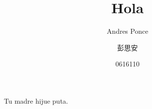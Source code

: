 \documentclass{article}
\author{Andres Ponce \\
	\and
	彭思安\\
	\and
	0616110
}
\title{Hola}
\begin{document}
\maketitle
Tu madre hijue puta.
\end{document}
